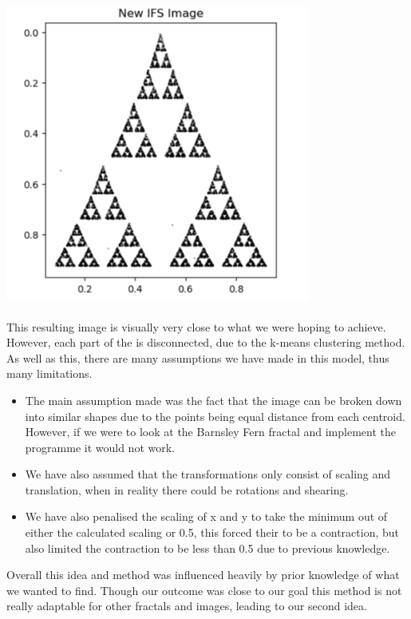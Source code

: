\documentclass[a4paper,11pt, titlepage]{article}
\theoremstyle{definition}
\theoremstyle{plain}
\theoremstyle{remark}
\theoremstyle{definition}
\begin{document}
\begin{minipage}{0.45\textwidth}
       \includegraphics[width=10cm, height=10cm]{pic10.png}
   \end{minipage}
   \hfill
   \begin{minipage}{0.43\textwidth}
       This resulting image is visually very close to what we were hoping to achieve. However, each part of the is disconnected, due to the k-means clustering method. As well as this, there are many assumptions we have made in this model, thus many limitations.
    \end{minipage}
    \begin{itemize}
        \item The main assumption made was the fact that the image can be broken down into similar shapes due to the points being equal distance from each centroid. However, if we were to look at the Barnsley Fern fractal and implement the programme it would not work.
        \item We have also assumed that the transformations only consist of scaling and translation, when in reality there could be rotations and shearing.
        \item We have also penalised the scaling of x and y to take the minimum out of either the calculated scaling or 0.5, this forced their to be a contraction, but also limited the contraction to be less than 0.5 due to previous knowledge.
    \end{itemize}

   Overall this idea and method was influenced heavily by prior knowledge of what we wanted to find. Though our outcome was close to our goal this method is not really adaptable for other fractals and images, leading to our second idea.
\end{document}

